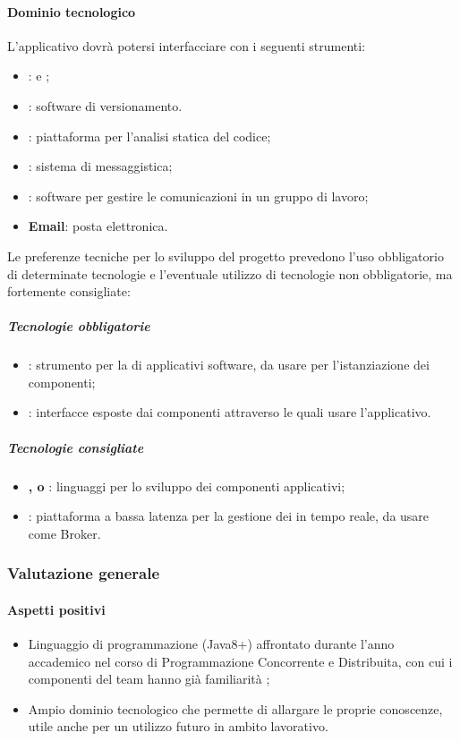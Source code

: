 	\paragraph{Dominio tecnologico} \Spazio
	L'applicativo dovrà potersi interfacciare con i seguenti strumenti:
	\begin{itemize}
		\item  \textbf{}:  e ;
		\item  \textbf{}: software di versionamento.
		\item  \textbf{}: piattaforma per l'analisi statica del codice;
		\item  \textbf{}: sistema di messaggistica;
		\item  \textbf{}: software per gestire le comunicazioni in un gruppo di lavoro;
		\item  \textbf{Email}: posta elettronica.
		
	\end{itemize}
	
	Le preferenze tecniche per lo sviluppo del progetto prevedono l'uso obbligatorio di determinate tecnologie e l'eventuale utilizzo di tecnologie non obbligatorie, ma fortemente consigliate:
	\subparagraph{Tecnologie obbligatorie}
	\begin{itemize}
		\item  \textbf{}: strumento per la  di applicativi software, da usare per l'istanziazione dei componenti;
		\item  \textbf{}: interfacce esposte dai componenti attraverso le quali usare l'applicativo.
	\end{itemize}
	\subparagraph{Tecnologie consigliate}
	\begin{itemize}
		\item \textbf{,  o }: linguaggi per lo sviluppo dei componenti applicativi;  
		\item  \textbf{}: piattaforma a bassa latenza per la gestione dei  in tempo reale, da usare come Broker.
	\end{itemize}
	\subsubsection{Valutazione generale}
	\paragraph{Aspetti positivi} 
	\begin{itemize}
		\item {Linguaggio di programmazione (Java8+) affrontato durante l'anno accademico nel corso di Programmazione Concorrente e Distribuita, con cui i componenti del team hanno già familiarità ;}
		\item{Ampio dominio tecnologico che permette di allargare le proprie conoscenze, utile anche per un utilizzo futuro in ambito lavorativo.}
	\end{itemize}
